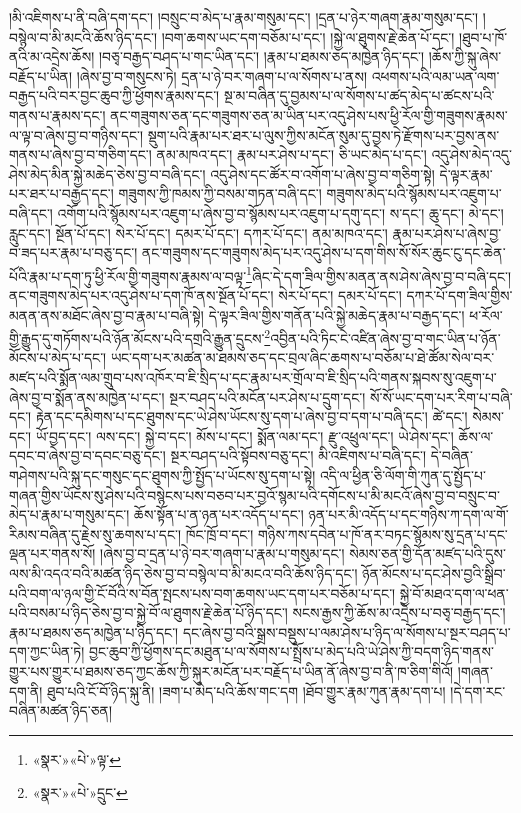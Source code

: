 །མི་འཇིགས་པ་ནི་བཞི་དག་དང་། །བསྲུང་བ་མེད་པ་རྣམ་གསུམ་དང་། །དྲན་པ་ཉེར་གཞག་རྣམ་གསུམ་དང་། །བསྙེལ་བ་མི་མངའི་ཆོས་ཉིད་དང་། །བག་ཆགས་ཡང་དག་བཅོམ་པ་དང་། །སྐྱེ་ལ་ཐུགས་རྗེ་ཆེན་པོ་དང་། །ཐུབ་པ་ཁོ་ནའི་མ་འདྲེས་ཆོས། །བཅྭ་བརྒྱད་བཤད་པ་གང་ཡིན་དང་། །རྣམ་པ་ཐམས་ཅད་མཁྱེན་ཉིད་དང་། །ཆོས་ཀྱི་སྐུ་ཞེས་བརྗོད་པ་ཡིན། །ཞེས་བྱ་བ་གསུངས་ཏེ། དྲན་པ་ཉེ་བར་གཞག་པ་ལ་སོགས་པ་ནས། འཕགས་པའི་ལམ་ཡན་ལག་བརྒྱད་པའི་བར་བྱང་ཆུབ་ཀྱི་ཕྱོགས་རྣམས་དང་། སྔ་མ་བཞིན་དུ་བྱམས་པ་ལ་སོགས་པ་ཚད་མེད་པ་ཚངས་པའི་གནས་པ་རྣམས་དང་། ནང་གཟུགས་ཅན་དང་གཟུགས་ཅན་མ་ཡིན་པར་འདུ་ཤེས་པས་ཕྱི་རོལ་གྱི་གཟུགས་རྣམས་ལ་ལྟ་བ་ཞེས་བྱ་བ་གཉིས་དང་། སྡུག་པའི་རྣམ་པར་ཐར་པ་ལུས་ཀྱིས་མངོན་སུམ་དུ་བྱས་ཏེ་རྫོགས་པར་བྱས་ནས་གནས་པ་ཞེས་བྱ་བ་གཅིག་དང་། ནམ་མཁའ་དང་། རྣམ་པར་ཤེས་པ་དང་། ཅི་ཡང་མེད་པ་དང་། འདུ་ཤེས་མེད་འདུ་ཤེས་མེད་མིན་སྐྱེ་མཆེད་ཅེས་བྱ་བ་བཞི་དང་། འདུ་ཤེས་དང་ཚོར་བ་འགོག་པ་ཞེས་བྱ་བ་གཅིག་སྟེ། དེ་ལྟར་རྣམ་པར་ཐར་པ་བརྒྱད་དང་། གཟུགས་ཀྱི་ཁམས་ཀྱི་བསམ་གཏན་བཞི་དང་། གཟུགས་མེད་པའི་སྙོམས་པར་འཇུག་པ་བཞི་དང་། འགོག་པའི་སྙོམས་པར་འཇུག་པ་ཞེས་བྱ་བ་སྙོམས་པར་འཇུག་པ་དགུ་དང་། ས་དང་། ཆུ་དང་། མེ་དང་། རླུང་དང་། སྔོན་པོ་དང་། སེར་པོ་དང་། དམར་པོ་དང་། དཀར་པོ་དང་། ནམ་མཁའ་དང་། རྣམ་པར་ཤེས་པ་ཞེས་བྱ་བ་ཟད་པར་རྣམ་པ་བཅུ་དང་། ནང་གཟུགས་དང་གཟུགས་མེད་པར་འདུ་ཤེས་པ་དག་གིས་སོ་སོར་ཆུང་ངུ་དང་ཆེན་པོའི་རྣམ་པ་དག་ཏུ་ཕྱི་རོལ་གྱི་གཟུགས་རྣམས་ལ་བལྟ་\footnote{«སྣར་»«པེ་»ལྟ་}ཞིང་དེ་དག་ཟིལ་གྱིས་མནན་ནས་ཤེས་ཞེས་བྱ་བ་བཞི་དང་། ནང་གཟུགས་མེད་པར་འདུ་ཤེས་པ་དག་ཁོ་ནས་སྔོན་པོ་དང་། སེར་པོ་དང་། དམར་པོ་དང་། དཀར་པོ་དག་ཟིལ་གྱིས་མནན་ནས་མཐོང་ཞེས་བྱ་བ་རྣམ་པ་བཞི་སྟེ། དེ་ལྟར་ཟིལ་གྱིས་གནོན་པའི་སྐྱེ་མཆེད་རྣམ་པ་བརྒྱད་དང་། ཕ་རོལ་གྱི་རྒྱུད་དུ་གཏོགས་པའི་ཉོན་མོངས་པའི་དགྲའི་རྒྱུན་དྲུངས་\footnote{«སྣར་»«པེ་»དྲུང་}འབྱིན་པའི་ཏིང་ངེ་འཛིན་ཞེས་བྱ་བ་གང་ཡིན་པ་ཉོན་མོངས་པ་མེད་པ་དང་། ཡང་དག་པར་མཚན་མ་ཐམས་ཅད་དང་བྲལ་ཞིང་ཆགས་པ་བཅོམ་པ་ཐེ་ཚོམ་སེལ་བར་མཛད་པའི་སྨོན་ལམ་གྲུབ་པས་འཁོར་བ་ཇི་སྲིད་པ་དང་རྣམ་པར་གྲོལ་བ་ཇི་སྲིད་པའི་གནས་སྐབས་སུ་འཇུག་པ་ཞེས་བྱ་བ་སྨོན་ནས་མཁྱེན་པ་དང་། སྔར་བཤད་པའི་མངོན་པར་ཤེས་པ་དྲུག་དང་། སོ་སོ་ཡང་དག་པར་རིག་པ་བཞི་དང་། རྟེན་དང་དམིགས་པ་དང་ཐུགས་དང་ཡེ་ཤེས་ཡོངས་སུ་དག་པ་ཞེས་བྱ་བ་དག་པ་བཞི་དང་། ཚེ་དང་། སེམས་དང་། ཡོ་བྱད་དང་། ལས་དང་། སྐྱེ་བ་དང་། མོས་པ་དང་། སྨོན་ལམ་དང་། རྫུ་འཕྲུལ་དང་། ཡེ་ཤེས་དང་། ཆོས་ལ་དབང་བ་ཞེས་བྱ་བ་དབང་བཅུ་དང་། སྔར་བཤད་པའི་སྟོབས་བཅུ་དང་། མི་འཇིགས་པ་བཞི་དང་། དེ་བཞིན་གཤེགས་པའི་སྐུ་དང་གསུང་དང་ཐུགས་ཀྱི་སྤྱོད་པ་ཡོངས་སུ་དག་པ་སྟེ། འདི་ལ་ཕྱིན་ཅི་ལོག་གི་ཀུན་དུ་སྤྱོད་པ་གཞན་གྱིས་ཡོངས་སུ་ཤེས་པའི་བསྙེངས་པས་བཅབ་པར་བྱའོ་སྙམ་པའི་དགོངས་པ་མི་མངའོ་ཞེས་བྱ་བ་བསྲུང་བ་མེད་པ་རྣམ་པ་གསུམ་དང་། ཆོས་སྟོན་པ་ན་ཉན་པར་འདོད་པ་དང་། ཉན་པར་མི་འདོད་པ་དང་གཉིས་ཀ་དག་ལ་གོ་རིམས་བཞིན་དུ་རྗེས་སུ་ཆགས་པ་དང་། ཁོང་ཁྲོ་བ་དང་། གཉིས་ཀས་དབེན་པ་ཁོ་ནར་བཏང་སྙོམས་སུ་དྲན་པ་དང་ལྡན་པར་གནས་སོ། །ཞེས་བྱ་བ་དྲན་པ་ཉེ་བར་གཞག་པ་རྣམ་པ་གསུམ་དང་། སེམས་ཅན་གྱི་དོན་མཛད་པའི་དུས་ལས་མི་འདའ་བའི་མཚན་ཉིད་ཅེས་བྱ་བ་བསྙེལ་བ་མི་མངའ་བའི་ཆོས་ཉིད་དང་། ཉོན་མོངས་པ་དང་ཤེས་བྱའི་སྒྲིབ་པའི་བག་ལ་ཉལ་གྱི་ངོ་བོའི་ས་བོན་སྤངས་པས་བག་ཆགས་ཡང་དག་པར་བཅོམ་པ་དང་། སྐྱེ་བོ་མཐའ་དག་ལ་ཕན་པའི་བསམ་པ་ཉིད་ཅེས་བྱ་བ་སྐྱེ་བོ་ལ་ཐུགས་རྗེ་ཆེན་པོ་ཉིད་དང་། སངས་རྒྱས་ཀྱི་ཆོས་མ་འདྲེས་པ་བཅྭ་བརྒྱད་དང་། རྣམ་པ་ཐམས་ཅད་མཁྱེན་པ་ཉིད་དང་། དང་ཞེས་བྱ་བའི་སྒྲས་བསྡུས་པ་ལམ་ཤེས་པ་ཉིད་ལ་སོགས་པ་སྔར་བཤད་པ་དག་ཀྱང་ཡིན་ཏེ། བྱང་ཆུབ་ཀྱི་ཕྱོགས་དང་མཐུན་པ་ལ་སོགས་པ་སྤྲོས་པ་མེད་པའི་ཡེ་ཤེས་ཀྱི་བདག་ཉིད་གནས་གྱུར་པས་གྱུར་པ་ཐམས་ཅད་ཀྱང་ཆོས་ཀྱི་སྐུར་མངོན་པར་བརྗོད་པ་ཡིན་ནོ་ཞེས་བྱ་བ་ནི་ཁ་ཅིག་གིའོ། །གཞན་དག་ནི། ཐུབ་པའི་ངོ་བོ་ཉིད་སྐུ་ནི། །ཟག་པ་མེད་པའི་ཆོས་གང་དག །ཐོབ་གྱུར་རྣམ་ཀུན་རྣམ་དག་པ། །དེ་དག་རང་བཞིན་མཚན་ཉིད་ཅན། 